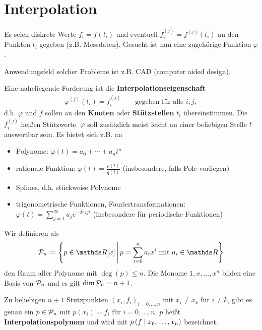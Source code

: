 % 
% 
% 
% 


\chapter{Interpolation}
Es seien diskrete Werte $f_i=f(t_i)$ und 
eventuell $f_i^{(j)} = f^{(j)}(t_i)$ 
an den Punkten $t_i$ gegeben (z.B. Messdaten).
Gesucht ist nun eine zugehörige Funktion $\varphi$.

Anwendungsfeld solcher Probleme ist z.B. CAD (computer aided
design).

Eine naheliegende Forderung ist die
\textbf{Interpolationseigenschaft}
\begin{gather*}
  \varphi^{(j)} (t_i) = f_i^{(j)}\qquad \text{gegeben für alle } i,j ,
\end{gather*}
d.h. $\varphi$ und $f$ sollen an den \textbf{Knoten} oder 
\textbf{Stützstellen} $t_i$ übereinstimmen.
Die $f_i^{(j)}$ heißen Stützwerte.
$\varphi$ soll zusätzlich meist leicht an einer beliebigen Stelle $t$
auswertbar sein. 
Es bietet sich z.B. an 
\begin{itemize}
\item Polynome: $\varphi(t) = a_0+\dotsb +a_n t^n$
\item rationale Funktion: $\varphi(t) = \frac{p(t)}{q(t)} $
  (insbesondere, falls Pole vorliegen)
\item Splines, d.h. stückweise Polynome
\item trigonometrische Funktionen, Fouriertransformationen:
  $ \varphi (t) = \sum_{j=1}^{\infty} a_je^{-2\pi ijt}$
  (insbesondere für periodische Funktionen)
\end{itemize}

Wir definieren als 
\begin{gather}
  \p_n \coloneqq \left\{ p \in \R[x]\,\middle\vert\,
    p= \sum_{i=0}^{n} a_ix^i \text{ mit } a_i\in\R \right\}
  \label{VI.1.1}
\end{gather}
den Raum aller Polynome mit $\deg(p)\leq n$.
Die Monome $1,x, \dotsc , x^n$ bilden eine Basis von $\mathcal{P}_n$
und es gilt $\dim\mathcal{P}_n = n+1$.


\begin{Satze}\label{6.1.1}
  Zu beliebigen $n+1$ Stützpunkten $(x_i, f_i)_{i=0, \dotsc, n}$ 
  mit $x_i\neq x_k$ für $i\neq k$,
  gibt es genau ein $p\in \mathcal{P}_n$ mit $p(x_i) = f_i$ für $i=0,
  \dotsc ,n$.
  $p$ heißt \textbf{Interpolationspolynom}
  und wird mit $p\left( f \mid x_0, \dotsc, x_n \right)$ bezeichnet.
\end{Satze}


